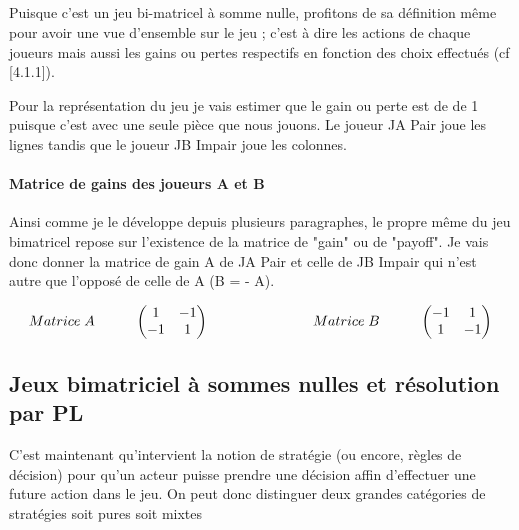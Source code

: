 \documentclass[a4paper, 12pt, twoside]{article}
\begin{document}
{\subparagraph*{}{Puisque c'est un jeu bi-matricel à somme nulle, profitons de sa définition même pour avoir une vue d'ensemble sur le jeu ; c'est à dire les actions de chaque joueurs mais aussi les gains ou pertes respectifs en fonction des choix effectués (cf [4.1.1]).} \newline

Pour la représentation du jeu je vais estimer que le gain ou perte est de de 1 puisque c'est avec une seule pièce que nous jouons. Le joueur \textsf{JA} \textsf{Pair} joue les lignes tandis que le joueur \textsf{JB} \textsf{Impair} joue les colonnes.  \vspace{0.4 cm}

\paragraph*{Matrice de gains des joueurs A et B}{Ainsi comme je le développe depuis plusieurs paragraphes, le propre même du jeu bimatricel repose sur l'existence de la matrice de "gain" ou de "payoff".  Je vais  donc donner la matrice de gain A de \textsf{JA} \textsf{Pair} et celle de \textsf{JB} \textsf{Impair} qui n'est autre que l'opposé de celle de  A (B = - A).}

\[
Matrice\hspace{0,1cm} A\hspace{1cm}
\begin{pmatrix}1&-1\\
-1&1\\
\end{pmatrix}\                      \hspace{2,5cm}  
Matrice\hspace{0,1cm} B \hspace{1cm}  
\begin{pmatrix}-1&1\\
1&-1\\
\end{pmatrix} 
\]

\subsection{Jeux bimatriciel à sommes nulles et résolution par PL}

C'est maintenant qu'intervient la notion de \textsf{stratégie} (ou encore, règles de décision) pour qu'un acteur puisse prendre une décision affin d'effectuer une future action dans le jeu.
On peut donc distinguer deux grandes catégories de \textsf{stratégies} soit pures soit mixtes \newline

}
\end{document}
